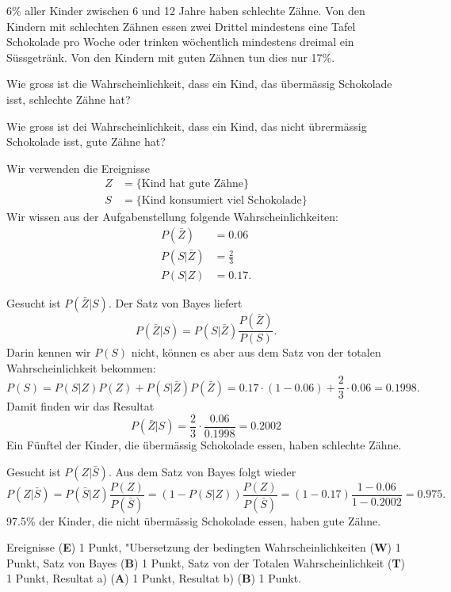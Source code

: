 $6\%$ aller Kinder zwischen 6 und 12 Jahre haben schlechte Zähne.
Von den Kindern mit schlechten Zähnen essen zwei Drittel mindestens eine
Tafel Schokolade pro Woche oder trinken wöchentlich mindestens
dreimal ein Süssgetränk. Von den Kindern mit guten Zähnen tun dies
nur 17\%.
\begin{teilaufgaben}
\item Wie gross ist die Wahrscheinlichkeit, dass ein Kind, das übermässig
Schokolade isst, schlechte Zähne hat?
\item Wie gross ist dei Wahrscheinlichkeit, dass ein Kind, das nicht
übrermässig Schokolade isst, gute Zähne hat?
\end{teilaufgaben}

\begin{loesung}
Wir verwenden die Ereignisse
\begin{align*}
Z&=\{\text{Kind hat gute Zähne}\}
\\
S&=\{\text{Kind konsumiert viel Schokolade}\}
\end{align*}
Wir wissen aus der Aufgabenstellung folgende Wahrscheinlichkeiten:
\begin{align*}
P(\bar Z)&=0.06\\
P(S|\bar Z)&=\frac23\\
P(S|Z)&=0.17.
\end{align*}
\begin{teilaufgaben}
\item Gesucht ist $P(\bar Z|S)$. Der Satz von Bayes liefert
\[
P(\bar Z|S)= P(S|\bar Z) \frac{P(\bar Z)}{P(S)}.
\]
Darin kennen wir $P(S)$ nicht, können es aber aus dem Satz von der
totalen Wahrscheinlichkeit bekommen:
\[
P(S)=P(S|Z)P(Z)+P(S|\bar Z)P(\bar Z)
=0.17\cdot (1-0.06)+\frac23\cdot 0.06=0.1998.
\]
Damit finden wir das Resultat
\[
P(\bar Z|S)=\frac23\cdot \frac{0.06}{0.1998}=0.2002
\]
Ein Fünftel der Kinder, die übermässig Schokolade essen, haben
schlechte Zähne.
\item Gesucht ist $P(Z|\bar S)$. Aus dem Satz von Bayes folgt wieder
\[
P(Z|\bar S)=P(\bar S|Z)\frac{P(Z)}{P(\bar S)}=(1-P(S|Z))\frac{P(Z)}{P(\bar S)}
=(1-0.17)\frac{1-0.06}{1-0.2002}=0.975.
\]
97.5\% der Kinder, die nicht übermässig Schokolade essen, haben gute 
Zähne.
\qedhere
\end{teilaufgaben}
\end{loesung}

\begin{bewertung}
Ereignisse ({\bf E}) 1 Punkt,
"Ubersetzung der bedingten Wahrscheinlichkeiten ({\bf W}) 1 Punkt,
Satz von Bayes ({\bf B}) 1 Punkt,
Satz von der Totalen Wahrscheinlichkeit ({\bf T}) 1 Punkt,
Resultat a) ({\bf A}) 1 Punkt,
Resultat b) ({\bf B}) 1 Punkt.
\end{bewertung}



